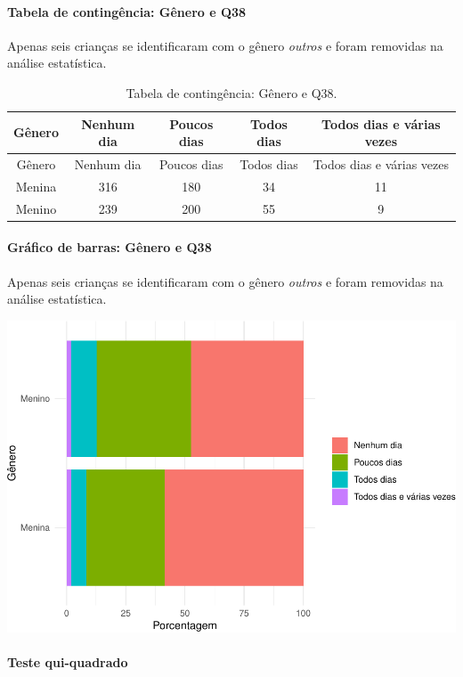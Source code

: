 \documentclass[]{article}
\let\oldparagraph\paragraph
\renewcommand{\paragraph}[1]{\oldparagraph{#1}\mbox{}}
\begin{document}
\cleardoublepage

\hypertarget{tabela-de-continguxeancia-guxeanero-e-q38}{%
\paragraph{Tabela de contingência: Gênero e Q38}\label{tabela-de-continguxeancia-guxeanero-e-q38}}

Apenas seis crianças se identificaram com o gênero \emph{outros} e foram removidas na análise estatística.

\begin{longtable}[]{@{}ccccc@{}}
\caption{\label{tab:unnamed-chunk-1439}Tabela de contingência: Gênero e Q38.}\tabularnewline
\toprule
Gênero & Nenhum dia & Poucos dias & Todos dias & Todos dias e várias vezes\tabularnewline
\midrule
\endfirsthead
\toprule
Gênero & Nenhum dia & Poucos dias & Todos dias & Todos dias e várias vezes\tabularnewline
\midrule
\endhead
Menina & 316 & 180 & 34 & 11\tabularnewline
Menino & 239 & 200 & 55 & 9\tabularnewline
\bottomrule
\end{longtable}

\hypertarget{gruxe1fico-de-barras-guxeanero-e-q38}{%
\paragraph{Gráfico de barras: Gênero e Q38}\label{gruxe1fico-de-barras-guxeanero-e-q38}}

Apenas seis crianças se identificaram com o gênero \emph{outros} e foram removidas na análise estatística.

\begin{center}\includegraphics[width=0.75\linewidth]{relatorio_covid19_files/figure-latex/unnamed-chunk-1440-1} \end{center}

\hypertarget{teste-qui-quadrado-123}{%
\paragraph{Teste qui-quadrado}\label{teste-qui-quadrado-123}}
\end{document}
